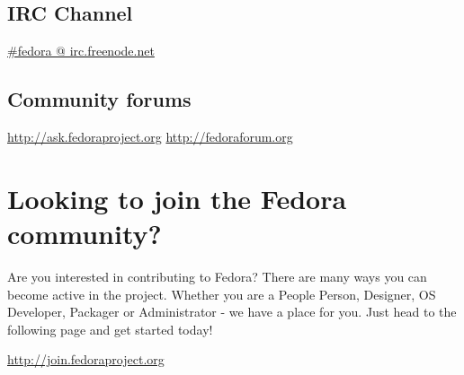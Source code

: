 \documentclass[
10pt
]{leaflet}
\begin{document}
\subsection{IRC Channel}
\href{http://webchat.freenode.net/?channels=#fedora}{\#fedora @ irc.freenode.net}

\subsection{Community forums}
\href{http://ask.fedoraproject.org}{http://ask.fedoraproject.org}
\href{http://fedoraforum.org}{http://fedoraforum.org}


\section{\textcolor{FedoraBlue}{Looking to join the Fedora community?}}
Are you interested in contributing to Fedora? There are many ways you can become active in the project.  Whether you are a People Person, Designer, OS Developer, Packager or Administrator - we have a place for you. Just head to the following page and get started today!

\begin{center}\href{http://join.fedoraproject.org}{http://join.fedoraproject.org}\end{center}
\end{document}

